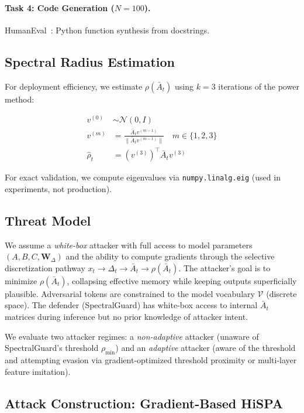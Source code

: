 \documentclass[10pt,twocolumn]{article}
\begin{document}
\paragraph{Task 4: Code Generation ($N{=}100$).}
HumanEval~\cite{chen2021evaluating}: Python function synthesis from docstrings.

\subsection{Spectral Radius Estimation}

For deployment efficiency, we estimate $\rho(\bar{A}_t)$ using $k=3$ iterations of the power method:

\begin{align}
v^{(0)} &\sim \mathcal{N}(0, I) \\
v^{(m)} &= \frac{\bar{A}_t v^{(m-1)}}{\|\bar{A}_t v^{(m-1)}\|} \quad m \in \{1,2,3\} \\
\hat{\rho}_t &= (v^{(3)})^\top \bar{A}_t v^{(3)}
\end{align}

For exact validation, we compute eigenvalues via \texttt{numpy.linalg.eig} (used in experiments, not production).

\subsection{Threat Model}
\label{sec:threat_model}

We assume a \emph{white-box} attacker with full access to model parameters $(A, B, C, \mathbf{W}_\Delta)$ and the ability to compute gradients through the selective discretization pathway $x_t \to \Delta_t \to \bar{A}_t \to \rho(\bar{A}_t)$. The attacker's goal is to minimize $\rho(\bar{A}_t)$, collapsing effective memory while keeping outputs superficially plausible. Adversarial tokens are constrained to the model vocabulary $\mathcal{V}$ (discrete space). The defender (SpectralGuard) has white-box access to internal $\bar{A}_t$ matrices during inference but no prior knowledge of attacker intent.

We evaluate two attacker regimes: a \emph{non-adaptive} attacker (unaware of SpectralGuard's threshold $\rho_{\min}$) and an \emph{adaptive} attacker (aware of the threshold and attempting evasion via gradient-optimized threshold proximity or multi-layer feature imitation).

\subsection{Attack Construction: Gradient-Based HiSPA}
\end{document}
